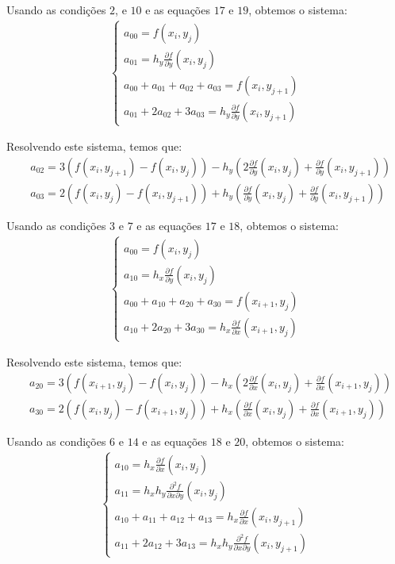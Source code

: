 \documentclass[a4paper, 12pt]{article}
\begin{document}
Usando as condições $2$, e $10$ e as equações $17$ e $19$, obtemos o sistema:
\begin{align*}
    \begin{cases}
        a_{00} = f(x_{i}, y_{j}) \\
        a_{01} = h_y \frac{\partial f}{\partial y}(x_i, y_j) \\
        a_{00} + a_{01} + a_{02} + a_{03} = f(x_i, y_{j+1}) \\
        a_{01} + 2a_{02} + 3a_{03} = h_y \frac{\partial f}{\partial y}(x_i, y_{j+1}) 
    \end{cases}
\end{align*}

Resolvendo este sistema, temos que:
\begin{align}
    &a_{02} = 3(f(x_i, y_{j+1}) - f(x_i, y_j)) - 
        h_y \left(2\frac{\partial f}{\partial y}(x_i, y_j) + \frac{\partial f}{\partial y}(x_i,y_{j+1})\right)
    \tag{21} \\
    &a_{03} = 2(f(x_i, y_j) - f(x_i, y_{j+1})) + 
    h_y \left(\frac{\partial f}{\partial y}(x_i, y_j) + \frac{\partial f}{\partial y}(x_i,y_{j+1})\right)
    \tag{22}
\end{align}

Usando as condições $3$ e $7$ e as equações $17$ e $18$, obtemos o sistema:
\begin{align*}
    \begin{cases}
        a_{00} = f(x_{i}, y_{j}) \\
        a_{10} = h_x \frac{\partial f}{\partial y}(x_i, y_j) \\
        a_{00} + a_{10} + a_{20} + a_{30} = f(x_{i+1}, y_j) \\
        a_{10} + 2a_{20} + 3a_{30} = h_x \frac{\partial f}{\partial x}(x_{i+1}, y_j) 
    \end{cases}
\end{align*}

Resolvendo este sistema, temos que:
\begin{align}
    &a_{20} = 3(f(x_{i+1}, y_j) - f(x_i, y_j)) - 
    h_x \left(2\frac{\partial f}{\partial x}(x_i, y_j) + \frac{\partial f}{\partial x}(x_{i+1},y_j)\right)
    \tag{23} \\
    &a_{30} = 2(f(x_i, y_j) - f(x_{i+1}, y_j)) + 
    h_x \left(\frac{\partial f}{\partial x}(x_i, y_j) + \frac{\partial f}{\partial x}(x_{i+1},y_j)\right)
    \tag{24}
\end{align}

Usando as condições $6$ e $14$ e as equações $18$ e $20$, obtemos o sistema:
\begin{align*}
    \begin{cases}
        a_{10} = h_{x} \frac{\partial f}{\partial x}(x_{i}, y_{j}) \\
        a_{11} = h_x h_y \frac{\partial^2 f}{\partial x \partial y}(x_i, y_j) \\
        a_{10} + a_{11} + a_{12} + a_{13} = h_x \frac{\partial f}{\partial x}(x_i, y_{j+1}) \\
        a_{11} + 2a_{12} + 3a_{13} = h_x h_y \frac{\partial^2 f}{\partial x \partial y}(x_i, y_{j+1}) 
    \end{cases}
\end{align*}
\end{document}

